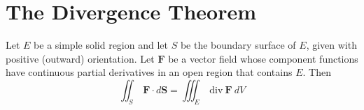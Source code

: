 \documentclass[12pt]{exam}
\newcommand{\qdate}{The Divergence Theorem} %
\newcommand{\mbf}{\mathbf{F}}
\begin{document}
\section*{\qdate}

\begin{theorem}
    Let \(E\) be a simple solid region and let \(S\) be the boundary surface of \(E\), given with positive (outward) orientation. Let \(\mbf\) be a vector field whose component functions have continuous partial derivatives in an open region that contains \(E\). Then
    \[
        \iint_S~\mbf\cdot d\bm{S}=\iiint_E~\mathrm{div}~\mbf~dV
    \]
\end{theorem}



\end{document}
